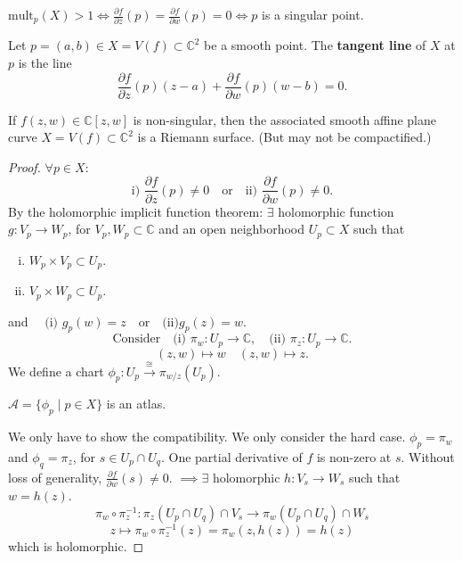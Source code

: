 \documentclass{article}
\begin{document}
\begin{remark}
$\text{mult}_p(X) > 1 \iff \frac{\partial f}{\partial z} (p) = \frac{\partial f}{\partial w} (p) = 0 \iff p$ is a singular point.
\end{remark}

\begin{definition}
Let $p = (a, b) \in X = V(f) \subset \mathbb{C}^2$ be a smooth point. The \textbf{tangent line} of $X$ at $p$ is the line
$$
\frac{\partial f}{\partial z} (p) (z-a) + \frac{\partial f}{\partial w} (p) (w-b) = 0.
$$
\end{definition}

\begin{theorem} \label{planecurvesaresurfaces}
If $f(z, w) \in \mathbb{C}[z, w]$ is non-singular, then the associated smooth affine plane curve $X = V(f) \subset \mathbb{C}^2$ is a Riemann surface.
(But may not be compactified.)
\end{theorem}

\begin{proof}
$\forall p \in X$:
$$
\text{i) } \frac{\partial f}{\partial z} (p) \ne 0 \quad \text{or} \quad \text{ii) } \frac{\partial f}{\partial w} (p) \ne 0.
$$
By the holomorphic implicit function theorem: $\exists$ holomorphic function $g: V_p \to W_p$,
for $V_p, W_p \subset \mathbb{C}$ and an open neighborhood $U_p \subset X$ such that
\begin{enumerate}[(i)]
    \item $W_p \times V_p \subset U_p$.
    \item $V_p \times W_p \subset U_p$.
\end{enumerate}
and $\quad \text{(i) } g_p(w) = z \quad \text{or} \quad \text{(ii)} g_p(z) = w.$
$$
\text{Consider} \quad \text{(i) } \pi_w : U_p \to \mathbb{C}, \quad \text{(ii) } \pi_z : U_p \to \mathbb{C}.
$$
$$
(z, w) \mapsto w \quad (z, w) \mapsto z.
$$
We define a chart $\phi_p: U_p \xrightarrow{\cong} \pi_{w/z}(U_p)$.

\begin{claim*}
$\mathcal{A} = \{ \phi_p \mid p \in X \}$ is an atlas.
\end{claim*}

We only have to show the compatibility. We only consider the hard case. $\phi_p = \pi_w$ and $\phi_q = \pi_z$, for $s \in U_p \cap U_q$.
One partial derivative of $f$ is non-zero at $s$.
Without loss of generality, $\frac{\partial f}{\partial w} (s) \ne 0$. $\implies \exists$ holomorphic $h: V_s \to W_s$ such that $w = h(z)$.
$$
\pi_w \circ \pi_z^{-1} : \pi_z (U_p \cap U_q) \cap V_s \to \pi_w (U_p \cap U_q) \cap W_s
$$
$$
z \longmapsto \pi_w \circ \pi_z^{-1} (z) = \pi_w (z, h(z)) = h(z)
$$
which is holomorphic.
\end{proof}
\end{document}
